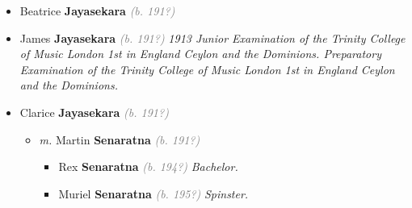 \documentclass[10pt, openany]{book}
\begin{document}
\begin{itemize}
{\begin{itemize}
{\begin{itemize}
{\begin{itemize}
{\begin{itemize}
{\begin{itemize}
{\begin{itemize}
\item{\textit{m.} Saumya \textbf{Wimaladharama} \textcolor{gray}{\textit{(b. 199?)}} \textcolor{slmaroon}{\textit{Attorney at Law.}}   \label{couple:00000274:00001028} \begin{itemize}
\item{Sarala \textbf{Jayasekara} \textcolor{gray}{\textit{(b. 202?)}}
 }
\item{UNKNOWN \textbf{Jayasekara} \textcolor{gray}{\textit{(b. 202?)}}
 }
\end{itemize}}
\end{itemize}
 }
\end{itemize}}
\end{itemize}
 }
\item{Ruth \textbf{Jayasekara} \textcolor{gray}{\textit{(b. 195?)}}
 }
\item{Mona \textbf{Jayasekara} \textcolor{gray}{\textit{(b. 195?)}}
 }
\end{itemize}}
\end{itemize}
 }
\item{Beatrice \textbf{Jayasekara} \textcolor{gray}{\textit{(b. 191?)}}
 }
\item{James \textbf{Jayasekara} \textcolor{gray}{\textit{(b. 191?)}} \textcolor{slmaroon}{\textit{1913 Junior Examination of the Trinity College of Music London 1st in England Ceylon and the Dominions. Preparatory Examination of the Trinity College of Music London 1st in England Ceylon and the Dominions.}}
 }
\item{Clarice \textbf{Jayasekara} \textcolor{gray}{\textit{(b. 191?)}}
\begin{itemize}
\item{\textit{m.} Martin \textbf{Senaratna} \textcolor{gray}{\textit{(b. 191?)}}   \label{couple:00000287:00000748} \begin{itemize}
\item{Rex \textbf{Senaratna} \textcolor{gray}{\textit{(b. 194?)}} \textcolor{slmaroon}{\textit{Bachelor.}}
 }
\item{Muriel \textbf{Senaratna} \textcolor{gray}{\textit{(b. 195?)}} \textcolor{slmaroon}{\textit{Spinster.}}
 }
\end{itemize}}
\end{itemize}
 }
\end{itemize}}
\end{itemize}
 
\end{document}
